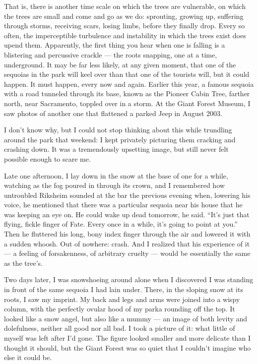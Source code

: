 That is, there is another time scale on which the trees are vulnerable,
on which the trees are small and come and go as we do: sprouting,
growing up, suffering through storms, receiving scars, losing limbs,
before they finally drop. Every so often, the imperceptible turbulence
and instability in which the trees exist does upend them. Apparently,
the first thing you hear when one is falling is a blistering and
percussive crackle --- the roots snapping, one at a time, underground.
It may be far less likely, at any given moment, that one of the sequoias
in the park will keel over than that one of the tourists will, but it
could happen. It must happen, every now and again. Earlier this year, a
famous sequoia with a road tunneled through its base, known as the
Pioneer Cabin Tree, farther north, near Sacramento, toppled over in a
storm. At the Giant Forest Museum, I saw photos of another one that
flattened a parked Jeep in August 2003.

I don't know why, but I could not stop thinking about this while
trundling around the park that weekend: I kept privately picturing them
cracking and crashing down. It was a tremendously upsetting image, but
still never felt possible enough to scare me.

Late one afternoon, I lay down in the snow at the base of one for a
while, watching as the fog poured in through its crown, and I remembered
how untroubled Riksheim sounded at the bar the previous evening when,
lowering his voice, he mentioned that there was a particular sequoia
near his house that he was keeping an eye on. He could wake up dead
tomorrow, he said. ``It's just that flying, fickle finger of Fate. Every
once in a while, it's going to point at you.'' Then he fluttered his
long, bony index finger through the air and lowered it with a sudden
whoosh. Out of nowhere: crash. And I realized that his experience of it
--- a feeling of forsakenness, of arbitrary cruelty --- would be
essentially the same as the tree's.

Two days later, I was snowshoeing around alone when I discovered I was
standing in front of the same sequoia I had lain under. There, in the
sloping snow at its roots, I saw my imprint. My back and legs and arms
were joined into a wispy column, with the perfectly ovular hood of my
parka rounding off the top. It looked like a snow angel, but also like a
mummy --- an image of both levity and dolefulness, neither all good nor
all bad. I took a picture of it: what little of myself was left after
I'd gone. The figure looked smaller and more delicate than I thought it
should, but the Giant Forest was so quiet that I couldn't imagine who
else it could be.

